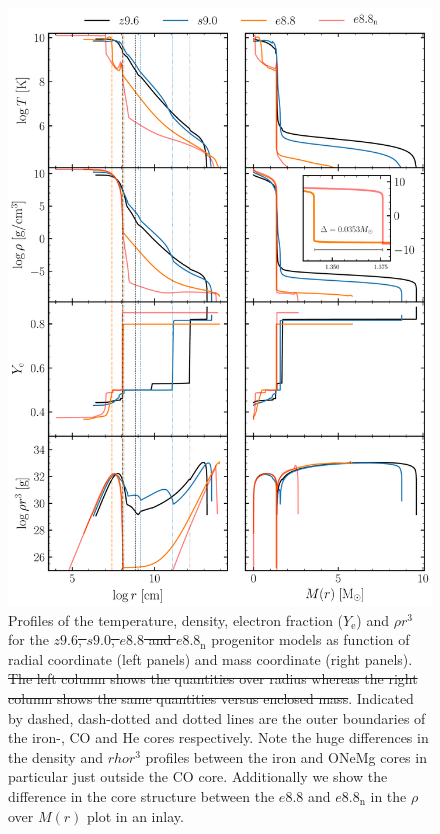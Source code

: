 \documentclass[fleqn,usenatbib]{mnras}
\newcommand{\NY}[2]{{\color{blue}\sout{#1}#2}}
\begin{document}
\begin{figure}
 \centering
 \includegraphics[scale=0.35]{./pic/progenitors_tem_rho_ye_rhor}
 \caption{Profiles of the temperature, density\NY{}{, electron fraction} ($Y_{\text{e}}$) and $\rho r^3$ for the \NY{$z9.6$, $s9.0$, $e8.8$ and $e8.8_{\mathrm{n}}$}{ progenitor models as function of radial coordinate (left panels) and mass coordinate (right panels)}. \NY{The left column shows the quantities over radius whereas the right column shows the same quantities versus enclosed mass}{}. Indicated by dashed, dash-dotted and dotted lines are the outer boundaries of the iron-, CO and He cores respectively. Note the huge differences in the density and $rho r^3$ profiles between the iron and ONeMg cores in particular just outside the CO core. Additionally we show the difference in the core structure between the $e8.8$ and $e8.8_{\mathrm{n}}$ in the $\rho$ over $M(r)$ plot in an inlay.}
 \label{fig:prog_tem_rho_ye_rhor}
\end{figure}
\end{document}
